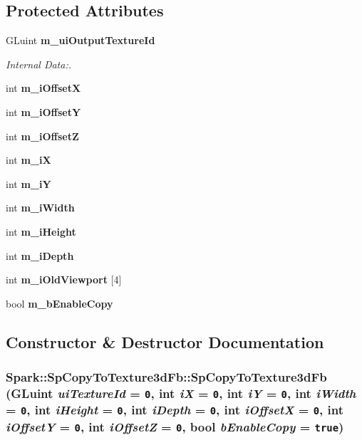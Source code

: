 \subsection*{Protected Attributes}
\begin{CompactItemize}
\item 
GLuint {\bf m\_\-ui\-Output\-Texture\-Id}
\begin{CompactList}\small\item\em Internal Data:. \item\end{CompactList}\item 
int {\bf m\_\-i\-Offset\-X}
\item 
int {\bf m\_\-i\-Offset\-Y}
\item 
int {\bf m\_\-i\-Offset\-Z}
\item 
int {\bf m\_\-i\-X}
\item 
int {\bf m\_\-i\-Y}
\item 
int {\bf m\_\-i\-Width}
\item 
int {\bf m\_\-i\-Height}
\item 
int {\bf m\_\-i\-Depth}
\item 
int {\bf m\_\-i\-Old\-Viewport} [4]
\item 
bool {\bf m\_\-b\-Enable\-Copy}
\end{CompactItemize}


\subsection{Constructor \& Destructor Documentation}
\subsubsection{\setlength{\rightskip}{0pt plus 5cm}Spark::Sp\-Copy\-To\-Texture3d\-Fb::Sp\-Copy\-To\-Texture3d\-Fb (GLuint {\em ui\-Texture\-Id} = {\tt 0}, int {\em i\-X} = {\tt 0}, int {\em i\-Y} = {\tt 0}, int {\em i\-Width} = {\tt 0}, int {\em i\-Height} = {\tt 0}, int {\em i\-Depth} = {\tt 0}, int {\em i\-Offset\-X} = {\tt 0}, int {\em i\-Offset\-Y} = {\tt 0}, int {\em i\-Offset\-Z} = {\tt 0}, bool {\em b\-Enable\-Copy} = {\tt true})\hspace{0.3cm}{\tt  [inline]}}\label{classSpark_1_1SpCopyToTexture3dFb_a0}


